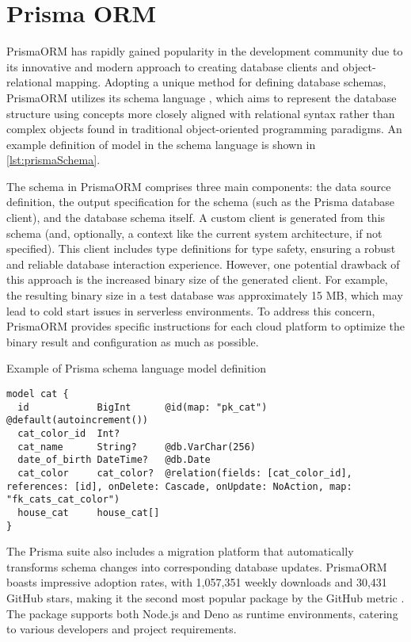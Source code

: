 \section{Prisma ORM}

PrismaORM has rapidly gained popularity in the development community due to its
innovative and modern approach to creating database clients and
object-relational mapping. Adopting a unique method for defining database
schemas, PrismaORM utilizes its schema language \cite{prismaDocsSchema}, which
aims to represent the database structure using concepts more closely aligned
with relational syntax rather than complex objects found in traditional
object-oriented programming paradigms. An example definition of model in the
schema language is shown in \autoref{lst:prismaSchema}.

The schema in PrismaORM comprises three main components: the data source
definition, the output specification for the schema (such as the Prisma database
client), and the database schema itself. A custom client is generated from this
schema (and, optionally, a context like the current system architecture, if not
specified). This client includes type definitions for type safety, ensuring a
robust and reliable database interaction experience. However, one potential
drawback of this approach is the increased binary size of the generated client.
For example, the resulting binary size in a test database was approximately 15
MB, which may lead to cold start issues in serverless environments. To address
this concern, PrismaORM provides specific instructions for each cloud platform
to optimize the binary result and configuration as much as possible.

\begin{listing}
\caption{Example of Prisma schema language model definition}
\label{lst:prismaSchema}
    \begin{verbatim}
model cat {
  id            BigInt      @id(map: "pk_cat") @default(autoincrement())
  cat_color_id  Int?
  cat_name      String?     @db.VarChar(256)
  date_of_birth DateTime?   @db.Date
  cat_color     cat_color?  @relation(fields: [cat_color_id], references: [id], onDelete: Cascade, onUpdate: NoAction, map: "fk_cats_cat_color")
  house_cat     house_cat[]
}
    \end{verbatim}
\end{listing}

The Prisma suite also includes a migration platform that automatically
transforms schema changes into corresponding database updates. PrismaORM boasts
impressive adoption rates, with 1,057,351 weekly downloads and 30,431 GitHub
stars, making it the second most popular package by the GitHub metric
\cite{prismaNpm} \cite{prismaGitHub}. The package supports both Node.js and Deno
as runtime environments, catering to various developers and project
requirements.

